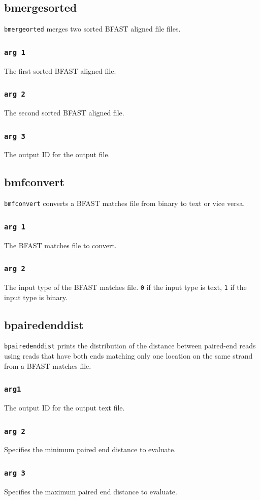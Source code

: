 \documentclass[a4paper,12pt]{book}
\newcommand{\TT}[1]{{\tt #1}} %
\newcommand{\BMF}{BFAST matches file} %
\newcommand{\BAF}{BFAST aligned file} %
\begin{document}
\subsection{bmergesorted}
\TT{bmergeorted} merges two sorted \BAF{} files.
\subsubsection{\TT{arg 1}}
The first sorted \BAF{}.
\subsubsection{\TT{arg 2}}
The second sorted \BAF{}.
\subsubsection{\TT{arg 3}}
The output ID for the output file.

\subsection{bmfconvert}
\label{sec:bmfconvert}
\TT{bmfconvert} converts a \BMF{} from binary to text or vice versa.
\subsubsection{\TT{arg 1}}
The \BMF{} to convert.
\subsubsection{\TT{arg 2}}
The input type of the \BMF{}. 
\TT{0} if the input type is text, \TT{1} if the input type is binary.
\subsection{bpairedenddist}
\label{sec:bpairedenddist}
\TT{bpairedenddist} prints the distribution of the distance between paired-end reads using reads that have both ends matching only one location on the same strand from a \BMF{}.
\subsubsection{\TT{arg1}}
The output ID for the output text file.
\subsubsection{\TT{arg 2}}
Specifies the minimum paired end distance to evaluate.
\subsubsection{\TT{arg 3}}
Specifies the maximum paired end distance to evaluate.
\end{document}
